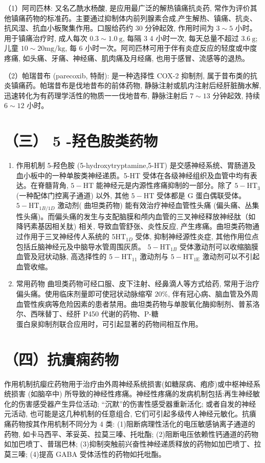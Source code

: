 \documentclass[10pt]{article}
\begin{document}
（1）阿司匹林: 又名乙酰水杨酸, 是应用最广泛的解热镇痛抗炎药, 常作为评价其他镇痛药物的标准药。主要通过抑制体内前列腺素合成,产生解热、镇痛、抗炎、抗风湿、抗血小板聚集作用。口服给药约 30 分钟起效, 作用时间为 $3 \sim 5$ 小时。用于镇痛治疗时, 成人每次 $0.3 \sim 1.0 \mathrm{~g}$, 每隔 3 4 小时一次, 每天总量不超过 $3.6 \mathrm{~g}$; 儿童 $10 \sim 20 \mathrm{mg} / \mathrm{kg}$, 每 6 小时一次。阿司匹林可用于伴有炎症反应的轻度或中度疼痛, 如头痛、牙痛、神经痛、肌肉痛及月经痛, 也用于感冒、流感等的退热。

（2）帕瑞昔布 (parecoxib, 特耐): 是一种选择性 COX-2 抑制剂, 属于昔布类的抗炎镇痛药。帕瑞昔布是伐地昔布的前体药物, 静脉注射或肌内注射后经肝脏酶水解, 迅速转化为有药理学活性的物质一一伐地昔布, 静脉注射后 $7 \sim 13$ 分钟起效, 持续 $6 \sim 12$ 小时。

\section*{（三） 5 -羟色胺类药物}
\begin{enumerate}
  \item 作用机制 5-羟色胺 (5-hydroxytryptamine,5-HT) 是交感神经系统、胃肠道及血小板中的一种单胺类神经递质。5-HT 受体在各级神经组织及血管中均有表达。在脊髓背角, $5-\mathrm{HT}$ 能神经元是内源性疼痛抑制的一部分。除了 $5-\mathrm{HT}_{3}$ (一种配体门控离子通道) 以外, 其他 $5-\mathrm{HT}$ 受体都是 G 蛋白偶联受体。 $5-\mathrm{HT}_{1 B / 1 D}$ 激动剂( 曲坦类药物) 能有效治疗神经血管性头痛 (偏头痛、丛集性头痛)。而偏头痛的发生与支配脑膜和颅内血管的三叉神经释放神经肽（如降钙素基因相关肽) 相关, 导致血管舒张、炎性反应, 产生疼痛。曲坦类药物通过作用于三叉神经传人系统的 5$\mathrm{HT}_{1 D}$ 受体, 抑制神经源性炎症, 其他作用位点包括丘脑神经元及中脑导水管周围灰质。 $5-\mathrm{HT}_{1 B}$ 受体激动剂可以收缩脑膜血管及冠状动脉, 高选择性的 $5-\mathrm{HT}_{11}$ 激动剂与 $5-\mathrm{HT}_{1 \mathrm{E}}$ 激动剂可以不引起血管收缩。

  \item 常用药物 曲坦类药物可经口服、皮下注射、经鼻滴人等方式给药, 常用于治疗偏头痛。使用临床剂量即可使冠状动脉缩窄 $20 \%$, 伴有冠心病、脑血管及外周血管性疾病等危险因素的患者禁用。曲坦类药物与单胺氧化酶抑制剂、普䒺洛尔、西咪替丁、经肝 P450 代谢的药物、P-糖\\
蛋白泉抑制剂联合应用时，可引起显著的药物间相互作用。

\end{enumerate}

\section*{（四）抗㿉痫药物}
作用机制抗瘿疘药物用于治疗由外周神经系统损害(如糖尿病、疱疹)或中枢神经系统损害 (如脑卒中) 所导致的神经性疼痛。神经性疼痛的发病机制包括:再生神经敏化的伤害感受器产生异位活动; “沉默”的伤害性感受器重新活化; 或者自发的神经元活动, 也可能是这几种机制的任意组合, 它们可引起多级传人神经元敏化。抗㿎痛药物按其作用机制不同分为 4 类: (1)阻断病理性活化的电压敏感钠离子通道的药物, 如卡马西平、苯妥英、拉莫三嗪、托吡酯; (2)阻断电压依赖性钙通道的药物如加巴喷丁、普瑞巴林; (3)抑制突触前兴奋性神经递质释放的药物如加巴喷丁、拉莫三嗪; (4)提高 GABA 受体活性的药物如托吡酯。
\end{document}

